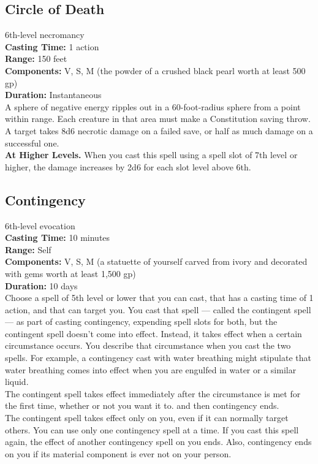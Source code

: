 \documentclass[11pt, A4paper, english]{article}
\begin{document}
		\subsection{Circle of Death}
6th-level necromancy \\
\textbf{Casting Time:} 1 action \\
\textbf{Range:} 150 feet \\
\textbf{Components:} V, S, M (the powder of a crushed black pearl worth at least 500 gp) \\
\textbf{Duration:} Instantaneous \\
A sphere of negative energy ripples out in a 60-foot-radius sphere from a point within range. Each creature in that area must make a Constitution saving throw. A target takes 8d6 necrotic damage on a failed save, or half as much damage on a successful one. \\
\textbf{At Higher Levels.} When you cast this spell using a spell slot of 7th level or higher, the damage increases by 2d6 for each slot level above 6th.

		\subsection{Contingency}
6th-level evocation \\
\textbf{Casting Time:} 10 minutes \\
\textbf{Range:} Self \\
\textbf{Components:} V, S, M (a statuette of yourself carved from ivory and decorated with gems worth at least 1,500 gp) \\
\textbf{Duration:} 10 days \\
Choose a spell of 5th level or lower that you can cast, that has a casting time of 1 action, and that can target you. You cast that spell — called the contingent spell — as part of casting contingency, expending spell slots for both, but the contingent spell doesn't come into effect. Instead, it takes effect when a certain circumstance occurs. You describe that circumstance when you cast the two spells. For example, a contingency cast with water breathing might stipulate that water breathing comes into effect when you are engulfed in water or a similar liquid. \\
The contingent spell takes effect immediately after the circumstance is met for the first time, whether or not you want it to. and then contingency ends. \\
The contingent spell takes effect only on you, even if it can normally target others. You can use only one contingency spell at a time. If you cast this spell again, the effect of another contingency spell on you ends. Also, contingency ends on you if its material component is ever not on your person.
\end{document}
